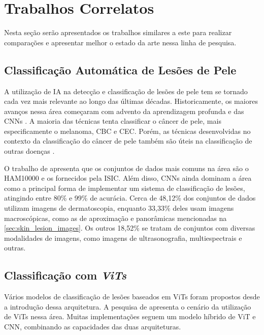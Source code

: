 \chapter{Trabalhos Correlatos} %

Nesta seção serão apresentados os trabalhos similares a este para realizar comparações e apresentar melhor o estado da arte nessa linha de pesquisa.

\section{Classificação Automática de Lesões de Pele}

A utilização de \ac{IA} na detecção e classificação de lesões de pele tem se tornado cada vez mais relevante ao longo das últimas décadas. Historicamente, os maiores
avanços nessa área começaram com advento da aprendizagem profunda e das \acp{CNN} \cite{li2019artificial}. A maioria das técnicas tenta classificar o câncer de pele, mais
especificamente o melanoma, \ac{CBC} e \ac{CEC}. Porém, as técnicas desenvolvidas no contexto da classificação do câncer de pele também são úteis na classificação de
outras doenças \cite{okuboyejo2018review}.

O trabalho de \textcite{skin_cancer_ai} apresenta que os conjuntos de dados mais comuns na área são o \ac{HAM10000} e os fornecidos pela \ac{ISIC}. Além disso, \acp{CNN}
ainda dominam a área como a principal forma de implementar um sistema de classificação de lesões, atingindo entre 80\% e 99\% de acurácia. Cerca de 48,12\% dos conjuntos
de dados utilizam imagens de dermatoscopia, enquanto 33,33\% deles usam imagens macroscópicas, como as de aproximação e panorâmicas mencionadas na
\autoref{sec:skin_lesion_images}. Os outros 18,52\% se tratam de conjuntos com diversas modalidades de imagens, como imagens de ultrasonografia, multiespectrais e outras.

\section{Classificação com \textit{ViTs}}

Vários modelos de classificação de lesões baseados em \acp{ViT} foram propostos desde a introdução dessa arquitetura. A pesquisa de \textcite{khan2023identifying}
apresenta o cenário da utilização de \acp{ViT} nessa área. Muitas implementações seguem um modelo híbrido de \ac{ViT} e \ac{CNN}, combinando as capacidades das duas
arquiteturas.

